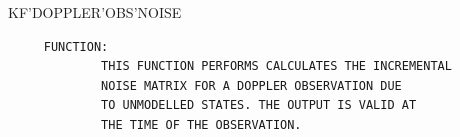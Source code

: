 \begin{frame}
KF'DOPPLER'OBS'NOISE
\begin{verbatim}
     FUNCTION:
             THIS FUNCTION PERFORMS CALCULATES THE INCREMENTAL
             NOISE MATRIX FOR A DOPPLER OBSERVATION DUE
             TO UNMODELLED STATES. THE OUTPUT IS VALID AT
             THE TIME OF THE OBSERVATION.

\end{verbatim}
\end{frame}
